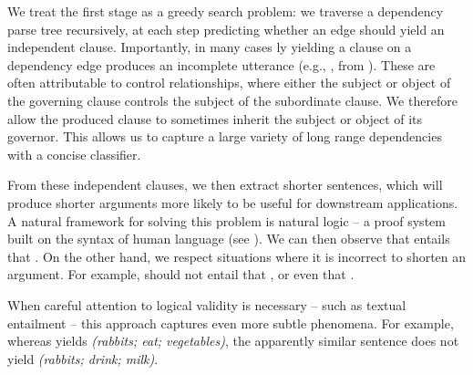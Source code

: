 We treat the first stage as a greedy search problem: we traverse
  a dependency parse tree recursively, at each step predicting whether an 
  edge should yield an independent clause.
Importantly, in many cases \naive ly yielding a clause on a dependency
  edge produces an incomplete utterance (e.g., ,
  from ).
These are often attributable to control relationships, where either the
  subject or object of the governing clause controls the subject of the
  subordinate clause.
We therefore allow the produced clause to sometimes inherit 
  the subject or object of its governor.
This allows us to capture a large variety of long range 
  dependencies with a concise classifier.
 
From these independent clauses, we then extract shorter sentences, which
  will produce shorter arguments more likely to be useful for downstream
  applications.
A natural framework for solving this problem is natural logic -- 
  a proof system built on the syntax of human language (see ).
We can then observe that
   entails that
  .
On the other hand, 
  we respect situations where it is incorrect to shorten an argument.
For example,  should not entail that
  , or even that .

When careful attention to logical validity is necessary -- such as 
  textual entailment -- this approach captures even more subtle phenomena.
For example, whereas  yields
  \textit{(rabbits; eat; vegetables)}, the apparently similar sentence
   does not yield
  \textit{(rabbits; drink; milk)}.

